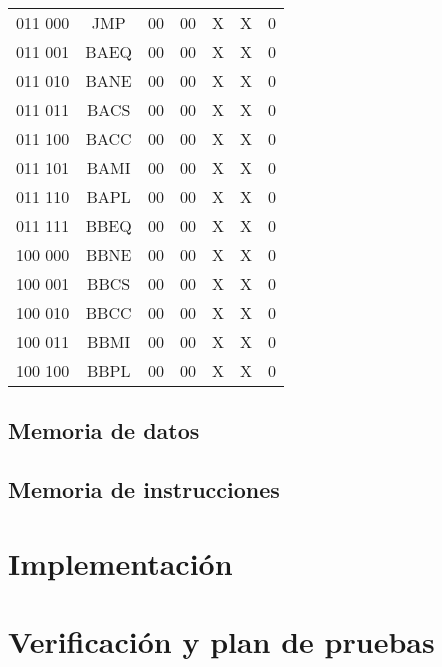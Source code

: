 \documentclass[paper=letter, fontsize=12pt]{article}
\begin{document}
\begin{table}[h]
\begin{tabular}{cc|ccccc}
011 000 	& JMP			& 00 	& 00    & X     & X     & 0 \\
011 001 	& BAEQ			& 00 	& 00    & X     & X     & 0 \\
011 010 	& BANE			& 00 	& 00    & X     & X     & 0 \\
011 011 	& BACS			& 00 	& 00    & X     & X     & 0 \\
011 100 	& BACC			& 00 	& 00    & X     & X     & 0 \\
011 101 	& BAMI			& 00 	& 00    & X     & X     & 0 \\
011 110 	& BAPL			& 00 	& 00    & X     & X     & 0 \\
011 111 	& BBEQ			& 00 	& 00    & X     & X     & 0 \\
100 000 	& BBNE			& 00 	& 00    & X     & X     & 0 \\
100 001 	& BBCS			& 00 	& 00    & X     & X     & 0 \\
100 010 	& BBCC			& 00 	& 00    & X     & X     & 0 \\
100 011 	& BBMI			& 00 	& 00    & X     & X     & 0 \\
100 100 	& BBPL			& 00 	& 00    & X     & X     & 0 \\

\end{tabular}
\end{table}


\subsection{Memoria de datos}

\subsection{Memoria de instrucciones}

\section{Implementación}

\section{Verificación y plan de pruebas}
\end{document}
